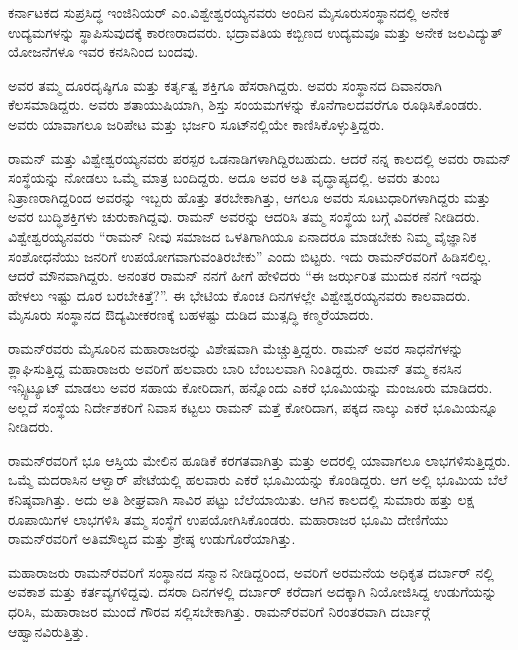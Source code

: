 
ಕರ್ನಾಟಕದ ಸುಪ್ರಸಿದ್ಧ ಇಂಜಿನಿಯರ್ ಎಂ.ವಿಶ್ವೇಶ್ವರಯ್ಯನವರು ಅಂದಿನ ಮೈಸೂರು\break ಸಂಸ್ಥಾನದಲ್ಲಿ ಅನೇಕ ಉದ್ಯಮಗಳನ್ನು ಸ್ಥಾಪಿಸುವುದಕ್ಕೆ ಕಾರಣರಾದವರು. ಭದ್ರಾವತಿಯ ಕಬ್ಬಿಣದ ಉದ್ಯಮವೂ ಮತ್ತು ಅನೇಕ ಜಲವಿದ್ಯುತ್ ಯೋಜನೆಗಳೂ ಇವರ ಕನಸಿನಿಂದ ಬಂದವು.

ಅವರ ತಮ್ಮ ದೂರದೃಷ್ಠಿಗೂ ಮತ್ತು ಕರ್ತೃತ್ವ ಶಕ್ತಿಗೂ ಹೆಸರಾಗಿದ್ದರು. ಅವರು ಸಂಸ್ಥಾನದ ದಿವಾನರಾಗಿ ಕೆಲಸಮಾಡಿದ್ದರು. ಅವರು ಶತಾಯುಷಿಯಾಗಿ, ಶಿಸ್ತು ಸಂಯಮಗಳನ್ನು ಕೊನೆಗಾಲದ\-ವರೆಗೂ ರೂಢಿಸಿಕೊಂಡರು. ಅವರು ಯಾವಾಗಲೂ ಜರಿಪೇಟ ಮತ್ತು ಭರ್ಜರಿ ಸೂಟ್‍ನಲ್ಲಿಯೇ ಕಾಣಿಸಿಕೊಳ್ಳುತ್ತಿದ್ದರು.

ರಾಮನ್ ಮತ್ತು ವಿಶ್ವೇಶ್ವರಯ್ಯನವರು ಪರಸ್ಪರ ಒಡನಾಡಿಗಳಾಗಿದ್ದಿರಬಹುದು. ಆದರೆ ನನ್ನ ಕಾಲದಲ್ಲಿ ಅವರು ರಾಮನ್ ಸಂಸ್ಥೆಯನ್ನು ನೋಡಲು ಒಮ್ಮೆ ಮಾತ್ರ ಬಂದಿದ್ದರು. ಅದೂ ಅವರ ಅತಿ ವೃದ್ಧಾಪ್ಯದಲ್ಲಿ. ಅವರು ತುಂಬ ನಿತ್ರಾಣರಾಗಿದ್ದರಿಂದ ಅವರನ್ನು ಇಬ್ಬರು ಹೊತ್ತು ತರಬೇಕಾಗಿತ್ತು, ಆಗಲೂ ಅವರು ಸೂಟುಧಾರಿಗಳಾಗಿದ್ದರು ಮತ್ತು ಅವರ ಬುದ್ಧಿಶಕ್ತಿಗಳು ಚುರುಕಾಗಿದ್ದವು. ರಾಮನ್ ಅವರನ್ನು ಆದರಿಸಿ ತಮ್ಮ ಸಂಸ್ಥೆಯ ಬಗ್ಗೆ ವಿವರಣೆ ನೀಡಿದರು. ವಿಶ್ವೇಶ್ವರಯ್ಯನವರು\enginline{--} “ರಾಮನ್ ನೀವು ಸಮಾಜದ ಒಳತಿಗಾಗಿಯೂ ಏನಾದರೂ ಮಾಡಬೇಕು ನಿಮ್ಮ ವೈಜ್ಞಾನಿಕ ಸಂಶೋಧನೆಯು ಜನರಿಗೆ ಉಪಯೋಗವಾಗುವಂತಿರಬೇಕು” ಎಂದು ಬಿಟ್ಟರು. ಇದು ರಾಮನ್‍ರವರಿಗೆ ಹಿಡಿಸಲಿಲ್ಲ. ಆದರೆ ಮೌನವಾಗಿದ್ದರು. ಅನಂತರ ರಾಮನ್ ನನಗೆ ಹೀಗೆ ಹೇಳಿದರು\enginline{--} “ಈ ಜರ್ಝರಿತ ಮುದುಕ ನನಗೆ ಇದನ್ನು ಹೇಳಲು ಇಷ್ಟು ದೂರ ಬರಬೇಕಿತ್ತೆ?”. ಈ ಭೇಟಿಯ ಕೊಂಚ ದಿನಗಳಲ್ಲೇ ವಿಶ್ವೇಶ್ವರಯ್ಯನವರು ಕಾಲವಾದರು. ಮೈಸೂರು ಸಂಸ್ಥಾನದ ಔದ್ಯಮೀಕರಣಕ್ಕೆ ಬಹಳಷ್ಟು ದುಡಿದ ಮುತ್ಸದ್ಧಿ ಕಣ್ಮರೆಯಾದರು.

\newpage


ರಾಮನ್‍ರವರು ಮೈಸೂರಿನ ಮಹಾರಾಜರನ್ನು ವಿಶೇಷವಾಗಿ ಮೆಚ್ಚುತ್ತಿದ್ದರು. ರಾಮನ್ ಅವರ ಸಾಧನೆಗಳನ್ನು ಶ್ಲಾಘಿಸುತ್ತಿದ್ದ ಮಹಾರಾಜರು ಅವರಿಗೆ ಹಲವಾರು ಬಾರಿ ಬೆಂಬಲವಾಗಿ ನಿಂತಿದ್ದರು. ರಾಮನ್ ತಮ್ಮ ಕನಸಿನ ಇನ್ಸ್ಟಿಟ್ಯೂಟ್ ಮಾಡಲು ಅವರ ಸಹಾಯ ಕೋರಿದಾಗ, ಹನ್ನೊಂದು ಎಕರೆ ಭೂಮಿಯನ್ನು ಮಂಜೂರು ಮಾಡಿದರು. ಅಲ್ಲದೆ ಸಂಸ್ಥೆಯ ನಿರ್ದೇಶಕರಿಗೆ ನಿವಾಸ ಕಟ್ಟಲು ರಾಮನ್ ಮತ್ತೆ ಕೋರಿದಾಗ, ಪಕ್ಕದ ನಾಲ್ಕು ಎಕರೆ ಭೂಮಿಯನ್ನೂ ನೀಡಿದರು.

ರಾಮನ್‍ರವರಿಗೆ ಭೂ ಆಸ್ತಿಯ ಮೇಲಿನ ಹೂಡಿಕೆ ಕರಗತವಾಗಿತ್ತು ಮತ್ತು ಅದರಲ್ಲಿ ಯಾವಾಗಲೂ ಲಾಭಗಳಿಸುತ್ತಿದ್ದರು. ಒಮ್ಮೆ ಮದರಾಸಿನ ಆಳ್ವಾರ್ ಪೇಟೆಯಲ್ಲಿ ಹಲವಾರು ಎಕರೆ ಭೂಮಿಯನ್ನು ಕೊಂಡಿದ್ದರು. ಆಗ ಅಲ್ಲಿ ಭೂಮಿಯ ಬೆಲೆ ಕನಿಷ್ಠವಾಗಿತ್ತು. ಅದು ಅತಿ ಶೀಘ್ರವಾಗಿ ಸಾವಿರ ಪಟ್ಟು ಬೆಲೆಯಾಯಿತು. ಆಗಿನ ಕಾಲದಲ್ಲಿ ಸುಮಾರು ಹತ್ತು ಲಕ್ಷ ರೂಪಾಯಿಗಳ ಲಾಭಗಳಿಸಿ ತಮ್ಮ ಸಂಸ್ಥೆಗೆ ಉಪಯೋಗಿಸಿಕೊಂಡರು. ಮಹಾರಾಜರ ಭೂಮಿ ದೇಣಿಗೆಯು ರಾಮನ್‍ರವರಿಗೆ ಅತಿಮೌಲ್ಯದ ಮತ್ತು ಶ್ರೇಷ್ಠ ಉಡುಗೊರೆಯಾಗಿತ್ತು.

ಮಹಾರಾಜರು ರಾಮನ್‍ರವರಿಗೆ ಸಂಸ್ಥಾನದ ಸನ್ಮಾನ ನೀಡಿದ್ದರಿಂದ, ಅವರಿಗೆ ಅರಮನೆಯ ಅಧಿಕೃತ ದರ್ಬಾರ್ ನಲ್ಲಿ ಅವಕಾಶ ಮತ್ತು ಕರ್ತವ್ಯಗಳಿದ್ದವು. ದಸರಾ ದಿನಗಳಲ್ಲಿ ದರ್ಬಾರ್ ಕರೆದಾಗ ಅದಕ್ಕಾಗಿ ನಿಯೋಜಿಸಿದ್ದ ಉಡುಗೆಯನ್ನು ಧರಿಸಿ, ಮಹಾರಾಜರ ಮುಂದೆ ಗೌರವ ಸಲ್ಲಿಸಬೇಕಾಗಿತ್ತು. ರಾಮನ್‍ರವರಿಗೆ ನಿರಂತರವಾಗಿ ದರ್ಬಾರ್‍ಗೆ ಆಹ್ವಾನವಿರುತ್ತಿತ್ತು.

